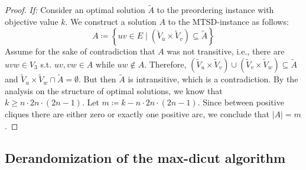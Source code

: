\begin{proof}
	\textit{If:} Consider an optimal solution $\tilde{A}$ to the preordering instance with objective value $k$.
	We construct a solution $A$ to the \textsc{MTSD}-instance as follows:
	\[
		A \coloneqq \left\{ uv \in E \mid (\tilde{V}_{u} \times \tilde{V}_{v}) \subseteq \tilde{A} \right\}
	\]
	Assume for the sake of contradiction that $A$ was not transitive, i.e., there are $uvw \in V_{3}$ s.t. $uv, vw \in A$ while $uw \notin A$.
	Therefore, $(\tilde{V}_{u} \times \tilde{V}_{v}) \cup (\tilde{V}_{v} \times \tilde{V}_{w}) \subseteq \tilde{A}$ and $\tilde{V}_{u} \times \tilde{V}_{w} \cap \tilde{A} = \emptyset$.
	But then $\tilde{A}$ is intransitive, which is a contradiction.
	By the analysis on the structure of optimal solutions, we know that $k \geq n \cdot 2n \cdot (2n-1)$. Let $m \coloneqq k - n \cdot 2n \cdot (2n-1)$.
	Since between positive cliques there are either zero or exactly one positive arc, we conclude that $\lvert A \rvert = m$.
\end{proof}



\subsection{Derandomization of the max-dicut algorithm} \label{sec:de-randomization}


